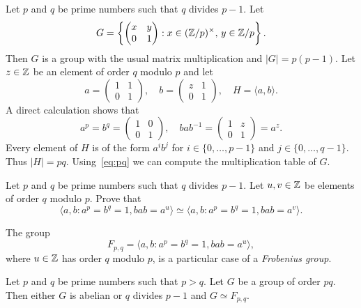 Let $p$ and $q$ be prime numbers such that $q$ divides $p-1$. Let 
\[
G=\left\{\begin{pmatrix}
x & y\\
0 & 1
\end{pmatrix}
:x\in(\mathbb{Z}/p)^\times,\,y\in\mathbb{Z}/p\right\}.
\]
Then $G$ is a group with the usual matrix multiplication
and $|G|=p(p-1)$. Let $z\in\mathbb{Z}$ be an element of order $q$ modulo $p$ 
and let 
\[
a=\begin{pmatrix}
1&1\\
0&1
\end{pmatrix},
\quad
b=\begin{pmatrix}
z&1\\
0&1
\end{pmatrix},
\quad
H=\langle a,b\rangle.
\]
A direct calculation shows that 
\begin{equation}
\label{eq:pq}
a^p=b^q=\begin{pmatrix}
1&0\\
0&1
\end{pmatrix},
\quad
bab^{-1}=\begin{pmatrix}
1&z\\
0&1
\end{pmatrix}
=a^z.
\end{equation}
Every element of $H$ is of the form $a^ib^j$ for $i\in\{0,\dots,p-1\}$ and  $j\in\{0,\dots,q-1\}$. 
Thus $|H|=pq$. Using~\eqref{eq:pq} we can compute 
the multiplication table of $G$. 

\begin{exercise}
    Let $p$ and $q$ be prime numbers such that $q$ divides $p-1$. Let
    $u,v\in\mathbb{Z}$ be elements of order $q$ modulo $p$. 
    Prove that 
    \[
    \langle a,b:a^p=b^q=1,bab=a^u\rangle
    \simeq \langle a,b:a^p=b^q=1,bab=a^v\rangle.
    \]
\end{exercise}

The group   
\[
F_{p,q}=\langle a,b:a^p=b^q=1,bab=a^u\rangle,
\]
where $u\in\mathbb{Z}$ has order $q$ modulo $p$, 
is a particular case of a  
\emph{Frobenius group}. 

\begin{proposition}
    Let $p$ and $q$ be prime numbers such that $p>q$. Let  
    $G$ be a group of order $pq$. Then either $G$ is abelian or
    $q$ divides $p-1$ and 
    $G\simeq F_{p,q}$.
\end{proposition}

